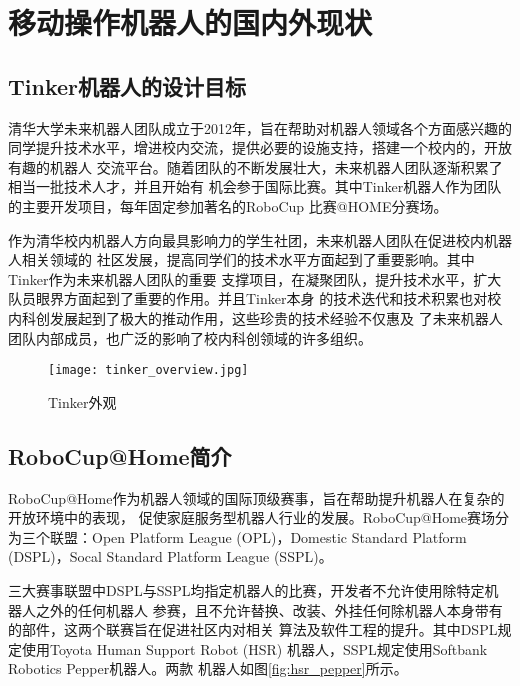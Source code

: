 
\chapter{移动操作机器人的国内外现状}
\label{cha:intro}



\section{Tinker机器人的设计目标}

清华大学未来机器人团队成立于2012年，旨在帮助对机器人领域各个方面感兴趣的
同学提升技术水平，增进校内交流，提供必要的设施支持，搭建一个校内的，开放有趣的机器人
交流平台。随着团队的不断发展壮大，未来机器人团队逐渐积累了相当一批技术人才，并且开始有
机会参于国际比赛。其中Tinker机器人作为团队的主要开发项目，每年固定参加著名的RoboCup
比赛@HOME分赛场\cite{wisspeintner2009robocup}。

作为清华校内机器人方向最具影响力的学生社团，未来机器人团队在促进校内机器人相关领域的
社区发展，提高同学们的技术水平方面起到了重要影响。其中Tinker作为未来机器人团队的重要
支撑项目，在凝聚团队，提升技术水平，扩大队员眼界方面起到了重要的作用。并且Tinker本身
的技术迭代和技术积累也对校内科创发展起到了极大的推动作用，这些珍贵的技术经验不仅惠及
了未来机器人团队内部成员，也广泛的影响了校内科创领域的许多组织。

\begin{figure}
  \centering
  \texttt{[image: tinker\_overview.jpg]}
  \caption{Tinker外观}
  \label{fig:tinker_overview}
\end{figure}


\section{RoboCup@Home简介}

RoboCup@Home作为机器人领域的国际顶级赛事，旨在帮助提升机器人在复杂的开放环境中的表现，
促使家庭服务型机器人行业的发展。RoboCup@Home赛场分为三个联盟：Open Platform League
(OPL)，Domestic Standard Platform (DSPL)，Socal Standard Platform League
 (SSPL)。

三大赛事联盟中DSPL与SSPL均指定机器人的比赛，开发者不允许使用除特定机器人之外的任何机器人
参赛，且不允许替换、改装、外挂任何除机器人本身带有的部件，这两个联赛旨在促进社区内对相关
算法及软件工程的提升。其中DSPL规定使用Toyota Human Support Robot (HSR)\cite{toyota_hsr}
机器人，SSPL规定使用Softbank Robotics Pepper\cite{pandey2018mass}机器人。两款
机器人如图\ref{fig:hsr_pepper}所示。

